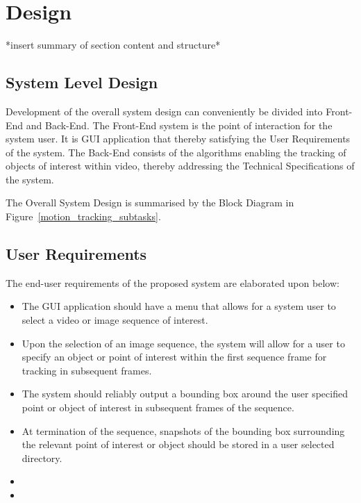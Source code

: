 \chapter{Design}\label{chapter_design}
*insert summary of section content and structure*

\section{System Level Design}
Development of the overall system design can conveniently be divided into
Front-End and Back-End. The Front-End system is the point of interaction for the
system user. It is GUI application that thereby satisfying the User Requirements
of the system. The Back-End consists of the algorithms enabling the tracking of
objects of interest within video, thereby addressing the Technical
Specifications of the system.

The Overall System Design is summarised by the Block Diagram in Figure~\ref{motion_tracking_subtasks}.


\section{User Requirements}
The end-user requirements of the proposed system are elaborated upon below:
\begin{itemize}
    \item The GUI application should have a menu that allows for a system
        user to select a video or image sequence of interest.
    \item Upon the selection of an image sequence, the system will allow for a
        user to specify an object or point of interest within the first sequence
        frame for tracking in subsequent frames.
    \item The system should reliably output a bounding box around the user
        specified point or object of interest in subsequent frames of the
        sequence. 
    \item At termination of the sequence, snapshots of the bounding box
        surrounding the relevant point of interest or object should be stored in
        a user selected directory.
    \item
    \item
\end{itemize}

